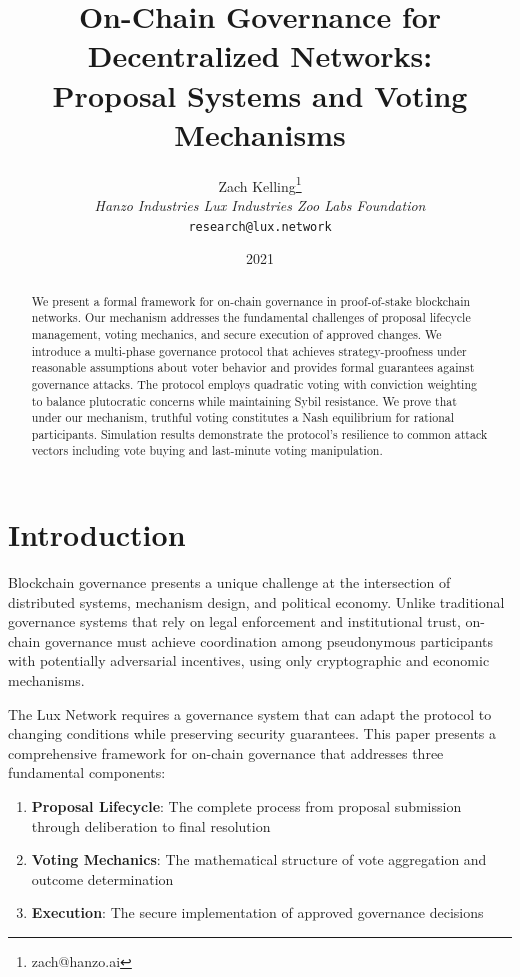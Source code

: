 \documentclass[11pt,a4paper]{article}
\title{On-Chain Governance for Decentralized Networks:\\
Proposal Systems and Voting Mechanisms}
\author{Zach Kelling\thanks{zach@hanzo.ai} \\ \textit{Hanzo Industries \quad Lux Industries \quad Zoo Labs Foundation} \\ \texttt{research@lux.network}}
\date{2021}
\theoremstyle{definition}
\theoremstyle{remark}
\begin{document}
\maketitle

\begin{abstract}
We present a formal framework for on-chain governance in proof-of-stake blockchain networks. Our mechanism addresses the fundamental challenges of proposal lifecycle management, voting mechanics, and secure execution of approved changes. We introduce a multi-phase governance protocol that achieves strategy-proofness under reasonable assumptions about voter behavior and provides formal guarantees against governance attacks. The protocol employs quadratic voting with conviction weighting to balance plutocratic concerns while maintaining Sybil resistance. We prove that under our mechanism, truthful voting constitutes a Nash equilibrium for rational participants. Simulation results demonstrate the protocol's resilience to common attack vectors including vote buying and last-minute voting manipulation.
\end{abstract}

\section{Introduction}

Blockchain governance presents a unique challenge at the intersection of distributed systems, mechanism design, and political economy. Unlike traditional governance systems that rely on legal enforcement and institutional trust, on-chain governance must achieve coordination among pseudonymous participants with potentially adversarial incentives, using only cryptographic and economic mechanisms.

The Lux Network requires a governance system that can adapt the protocol to changing conditions while preserving security guarantees. This paper presents a comprehensive framework for on-chain governance that addresses three fundamental components:

\begin{enumerate}[label=(\roman*)]
    \item \textbf{Proposal Lifecycle}: The complete process from proposal submission through deliberation to final resolution
    \item \textbf{Voting Mechanics}: The mathematical structure of vote aggregation and outcome determination
    \item \textbf{Execution}: The secure implementation of approved governance decisions
\end{enumerate}
\end{document}
